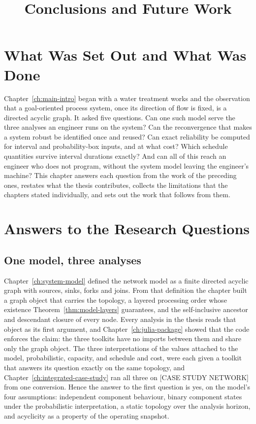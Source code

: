 \documentclass[12pt]{report}
\newcommand{\CaseStudyNetwork}{[CASE STUDY NETWORK]}
\begin{document}
\title{Conclusions and Future Work}
\fi

\providecommand{\PH}[1]{\textbf{[#1]}}

\section{What Was Set Out and What Was Done}
\label{sec:concl-summary}

Chapter~\ref{ch:main-intro} began with a water treatment works and the observation that a
goal-oriented process system, once its direction of flow is fixed, is a directed acyclic
graph. It asked five questions. Can one such model serve the three analyses an engineer runs on
the system? Can the reconvergence that makes a system robust be identified once and
reused? Can exact reliability be computed for interval and probability-box inputs, and at
what cost? Which schedule quantities survive interval durations exactly? And can all of
this reach an engineer who does not program, without the system model leaving the
engineer's machine? This chapter answers each question from the work of the
preceding ones, restates what the thesis contributes, collects the limitations that the
chapters stated individually, and sets out the work that follows from them.

\section{Answers to the Research Questions}
\label{sec:concl-answers}

\subsection{One model, three analyses}

Chapter~\ref{ch:system-model} defined the network model as a finite directed acyclic graph
with sources, sinks, forks and joins. From that definition the chapter built a graph object
that carries the topology, a layered processing order whose existence
Theorem~\ref{thm:model-layers} guarantees, and the self-inclusive ancestor and descendant
closure of every node. Every analysis in the thesis
reads that object as its first argument, and Chapter~\ref{ch:julia-package} showed that the
code enforces the claim: the three toolkits have no imports between them and share only the
graph object. The three interpretations of the values attached to the model, probabilistic,
capacity, and schedule and cost, were each given a toolkit that answers its question exactly
on the same topology, and Chapter~\ref{ch:integrated-case-study} ran all three on
\CaseStudyNetwork{} from one conversion. Hence the answer to the first question is yes, on the
model's four assumptions: independent component behaviour, binary component states under the
probabilistic interpretation, a static topology over the analysis horizon, and acyclicity as
a property of the operating snapshot.
\end{document}

